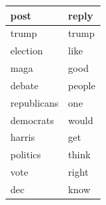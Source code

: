 \begin{tabular}{ll}
\toprule
post & reply \\
\midrule
trump & trump \\
election & like \\
maga & good \\
debate & people \\
republicans & one \\
democrats & would \\
harris & get \\
politics & think \\
vote & right \\
dec & know \\
\bottomrule
\end{tabular}
